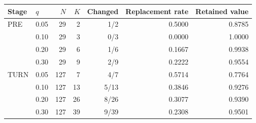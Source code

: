 \begin{tabular}{llrrrrr}
\toprule
Stage & $q$ & $N$ & $K$ & Changed & Replacement rate & Retained value \\
\midrule
PRE & 0.05 & 29 & 2 & 1/2 & 0.5000 & 0.8785 \\
 & 0.10 & 29 & 3 & 0/3 & 0.0000 & 1.0000 \\
 & 0.20 & 29 & 6 & 1/6 & 0.1667 & 0.9938 \\
 & 0.30 & 29 & 9 & 2/9 & 0.2222 & 0.9554 \\
TURN & 0.05 & 127 & 7 & 4/7 & 0.5714 & 0.7764 \\
 & 0.10 & 127 & 13 & 5/13 & 0.3846 & 0.9276 \\
 & 0.20 & 127 & 26 & 8/26 & 0.3077 & 0.9390 \\
 & 0.30 & 127 & 39 & 9/39 & 0.2308 & 0.9501 \\
\bottomrule
\end{tabular}


